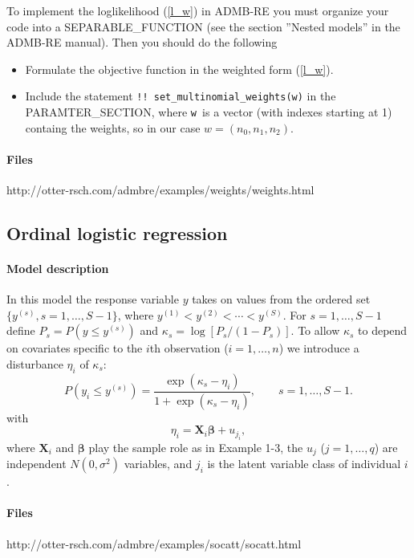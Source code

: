 \documentclass[12pt,letter,reqno]{book}
\begin{document}
To implement the loglikelihood (\ref{l_w}) in ADMB-RE you must organize your
code into a SEPARABLE\_FUNCTION (see the section ''Nested models'' in the
ADMB-RE manual). Then you should do the following

\begin{itemize}
\item Formulate the objective function in the weighted form (\ref{l_w}).

\item Include the statement \texttt{!! set\_multinomial\_weights(w)} in the
PARAMTER\_SECTION, where \texttt{w }is a vector (with indexes starting at 1)
containg the weights, so in our case $w=(n_{0},n_{1},n_{2})$.
\end{itemize}

\paragraph{Files} http://otter-rsch.com/admbre/examples/weights/weights.html

\newpage

\subsection{Ordinal logistic regression}
\label{sec:socatt_example}

\paragraph{Model description}
In this model the response variable $y$ takes on values from the ordered set
$\{y^{(s)},s=1,\ldots,S-1\}$, where $y^{(1)}<y^{(2)}<\cdots<y^{(S)}$. For
$s=1,\ldots,S-1$ define $P_s=P(y\leq y^{(s)})$ and $\kappa_s=\log
[P_s/(1-P_s)]$. To allow $\kappa_s$ to depend on covariates specific to the
$i$th observation ($i=1,\ldots,n$) we introduce a disturbance $\eta_i$ of
$\kappa_s$:
\[
  P(y_i\leq y^{(s)}) =
  \frac{\exp(\kappa_s-\eta_i)}
  {1+\exp(\kappa _{s}-\eta _{i})}, \qquad s=1,\ldots,S-1.
\]
with
\[
  \eta_i = \mathbf{X}_i\mathbf{\beta}+u_{j_i},
\]
where $\mathbf{X}_i$ and $\mathbf{\beta}$ play the sample role as in Example
1-3, the $u_j$ ($j=1,\ldots,q$) are independent $N(0,\sigma^2)$ variables, and
$j_i$ is the latent variable class of individual $i$.

\paragraph{Files} http://otter-rsch.com/admbre/examples/socatt/socatt.html
\end{document}
